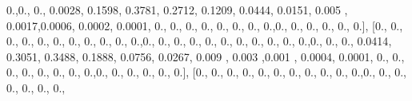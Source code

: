 \documentclass[
]{book}
\newenvironment{Shaded}{\begin{snugshade}}{\end{snugshade}}
\newcommand{\FloatTok}[1]{\textcolor[rgb]{0.00,0.00,0.81}{#1}}
\newcommand{\NormalTok}[1]{#1}
\begin{document}
\begin{Shaded}
\begin{Highlighting}[]
\FloatTok{0.}\NormalTok{,}\FloatTok{0.}\NormalTok{, }\FloatTok{0.}\NormalTok{, }\FloatTok{0.0028}\NormalTok{, }\FloatTok{0.1598}\NormalTok{, }\FloatTok{0.3781}\NormalTok{, }\FloatTok{0.2712}\NormalTok{, }\FloatTok{0.1209}\NormalTok{, }\FloatTok{0.0444}\NormalTok{, }\FloatTok{0.0151}\NormalTok{, }\FloatTok{0.005}\NormalTok{ ,}
\FloatTok{0.0017}\NormalTok{,}\FloatTok{0.0006}\NormalTok{, }\FloatTok{0.0002}\NormalTok{, }\FloatTok{0.0001}\NormalTok{, }\FloatTok{0.}\NormalTok{, }\FloatTok{0.}\NormalTok{, }\FloatTok{0.}\NormalTok{, }\FloatTok{0.}\NormalTok{, }\FloatTok{0.}\NormalTok{, }\FloatTok{0.}\NormalTok{, }\FloatTok{0.}\NormalTok{, }\FloatTok{0.}\NormalTok{,}\FloatTok{0.}\NormalTok{, }\FloatTok{0.}\NormalTok{, }\FloatTok{0.}\NormalTok{, }\FloatTok{0.}\NormalTok{,}
\FloatTok{0.}\NormalTok{, }\FloatTok{0.}\NormalTok{], [}\FloatTok{0.}\NormalTok{, }\FloatTok{0.}\NormalTok{, }\FloatTok{0.}\NormalTok{, }\FloatTok{0.}\NormalTok{, }\FloatTok{0.}\NormalTok{, }\FloatTok{0.}\NormalTok{, }\FloatTok{0.}\NormalTok{, }\FloatTok{0.}\NormalTok{, }\FloatTok{0.}\NormalTok{, }\FloatTok{0.}\NormalTok{, }\FloatTok{0.}\NormalTok{,}\FloatTok{0.}\NormalTok{, }\FloatTok{0.}\NormalTok{, }\FloatTok{0.}\NormalTok{, }\FloatTok{0.}\NormalTok{, }\FloatTok{0.}\NormalTok{, }\FloatTok{0.}\NormalTok{, }\FloatTok{0.}\NormalTok{,}
\FloatTok{0.}\NormalTok{, }\FloatTok{0.}\NormalTok{, }\FloatTok{0.}\NormalTok{, }\FloatTok{0.}\NormalTok{,}\FloatTok{0.}\NormalTok{, }\FloatTok{0.}\NormalTok{, }\FloatTok{0.}\NormalTok{, }\FloatTok{0.0414}\NormalTok{, }\FloatTok{0.3051}\NormalTok{, }\FloatTok{0.3488}\NormalTok{, }\FloatTok{0.1888}\NormalTok{, }\FloatTok{0.0756}\NormalTok{, }\FloatTok{0.0267}\NormalTok{, }\FloatTok{0.009}
\NormalTok{, }\FloatTok{0.003}\NormalTok{ ,}\FloatTok{0.001}\NormalTok{ , }\FloatTok{0.0004}\NormalTok{, }\FloatTok{0.0001}\NormalTok{, }\FloatTok{0.}\NormalTok{, }\FloatTok{0.}\NormalTok{, }\FloatTok{0.}\NormalTok{, }\FloatTok{0.}\NormalTok{, }\FloatTok{0.}\NormalTok{, }\FloatTok{0.}\NormalTok{, }\FloatTok{0.}\NormalTok{, }\FloatTok{0.}\NormalTok{,}\FloatTok{0.}\NormalTok{, }\FloatTok{0.}\NormalTok{, }\FloatTok{0.}\NormalTok{, }\FloatTok{0.}\NormalTok{,}
\FloatTok{0.}\NormalTok{, }\FloatTok{0.}\NormalTok{], [}\FloatTok{0.}\NormalTok{, }\FloatTok{0.}\NormalTok{, }\FloatTok{0.}\NormalTok{, }\FloatTok{0.}\NormalTok{, }\FloatTok{0.}\NormalTok{, }\FloatTok{0.}\NormalTok{, }\FloatTok{0.}\NormalTok{, }\FloatTok{0.}\NormalTok{, }\FloatTok{0.}\NormalTok{, }\FloatTok{0.}\NormalTok{, }\FloatTok{0.}\NormalTok{,}\FloatTok{0.}\NormalTok{, }\FloatTok{0.}\NormalTok{, }\FloatTok{0.}\NormalTok{, }\FloatTok{0.}\NormalTok{, }\FloatTok{0.}\NormalTok{, }\FloatTok{0.}\NormalTok{, }\FloatTok{0.}\NormalTok{,}

\end{Highlighting}
\end{Shaded}
\end{document}
